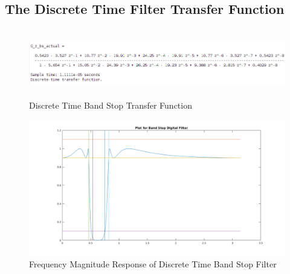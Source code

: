 \documentclass[22pt]{article}
\begin{document}
\subsection{The Discrete Time Filter Transfer Function}
\begin{figure}[H]
  \centering
  \includegraphics[width=1.2\textwidth,height=3cm]{images/Discrete_bs_tf}
  \caption{Discrete Time Band Stop Transfer Function}
  \label{fig:13}
\end{figure}
\begin{figure}[H]
  \centering
  \includegraphics[scale=0.5]{images/Freqz_digital_bs}
  \caption{Frequency Magnitude Response of Discrete Time Band Stop Filter}
  \label{fig:14}
\end{figure}
\end{document}
